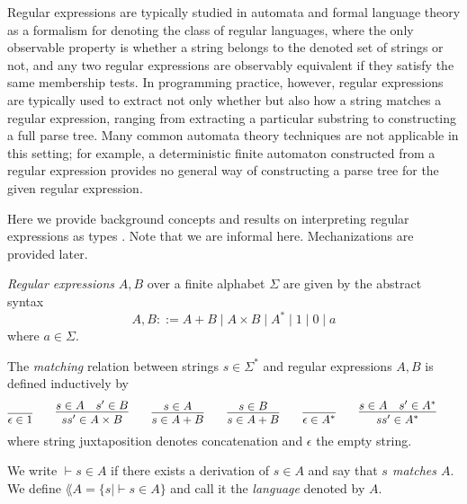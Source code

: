 %
Regular expressions are typically studied in automata and formal language theory as a formalism for denoting the class of regular languages, where the only observable property is whether a string belongs to the denoted set of strings or not, and any two regular expressions are observably equivalent if they satisfy the same membership tests.  In programming practice, however, regular expressions are typically used to extract not only whether but also how a string matches a regular expression, ranging from extracting a particular substring to constructing a full parse tree. Many common automata theory techniques are not applicable in this setting; for example, a deterministic finite automaton constructed from a regular expression provides no general way of constructing a parse tree for the given regular expression. 

Here we provide background concepts and results on interpreting regular expressions as types \cite{frca2004,nihe2011}. Note that we are informal here.  Mechanizations are provided later. 
\begin{definition}
\emph{Regular expressions} $A, B$ over a finite alphabet $\Sigma$ are given by the abstract syntax
$$A, B ::= A + B \mid A \times B \mid A ^* \mid 1 \mid 0 \mid a$$
where $a \in \Sigma$.
\end{definition}

\begin{definition}
The \emph{matching} relation between strings $s \in \Sigma^*$ and regular expressions $A, B$ is defined inductively by
\begin{displaymath} 
\infer{\match{\epsilon}{1}}{}\qquad
\infer{\match{s s'}{A \times B}}{\match{s}{A} & \match{s'}{B}} \qquad
\infer{\match{s} {A + B}}{\match{s}{A}} \qquad
\infer{\match{s} {A + B}}{\match{s}{B}} \qquad
\infer{\match{\epsilon}{A^*}}{}\qquad
\infer{\match{s s'}{A^*}}{\match{s}{A} & \match{s'}{A^*}}\qquad
\end{displaymath}
where string juxtaposition denotes concatenation and $\epsilon$ the empty string.

We write $\vdash s \in A$ if there exists a derivation of $s \in A$ and say that \emph{$s$ matches $A$}.
We define $\lang{A} = \{ s \mid \vdash s \in A \}$ and call it the \emph{language} denoted by $A$.
\end{definition}

